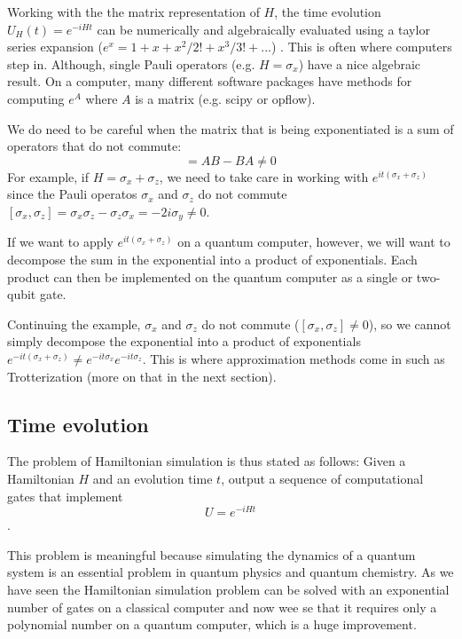 Working with the the matrix representation of $H$, the time evolution $U_H(t) = e^{-iHt}$ can be numerically and algebraically evaluated using a taylor series expansion ($e^x = 1 + x + x^2/2! + x^3/3! + ... $) . This is often where computers step in. Although, single Pauli operators (e.g. $H=\sigma_x$) have a nice algebraic result. On a computer, many different software packages have methods for computing $e^A$ where $A$ is a matrix (e.g. scipy or opflow).

We do need to be careful when the matrix that is being exponentiated is a sum of operators that do not commute:
\begin{equation}
[A,B] = AB - BA \neq 0
\end{equation}
 For example, if $H = \sigma_x + \sigma_z$, we need to take care in working with $e^{it(\sigma_x + \sigma_z)}$ since the Pauli operatos $\sigma_x$ and $\sigma_z$ do not commute $[\sigma_x, \sigma_z] = \sigma_x \sigma_z - \sigma_z \sigma_x = -2i\sigma_y \neq0$.
 
 If we want to apply $e^{it(\sigma_x + \sigma_z)}$ on a quantum computer, however, we will want to decompose the sum in the exponential into a product of exponentials. Each product can then be implemented on the quantum computer as a single or two-qubit gate. 
 
 Continuing the example, $\sigma_x$ and $\sigma_z$ do not commute ($[\sigma_x, \sigma_z] \neq 0$), so we cannot simply decompose the exponential into a product of exponentials $e^{-it(\sigma_x + \sigma_z)} \neq e^{-it\sigma_x}e^{-it\sigma_z}$. This is where approximation methods come in such as Trotterization (more on that in the next section).

\subsection{Time evolution}


The problem of Hamiltonian simulation is thus stated as follows: Given a Hamiltonian 
$H$ and an evolution time  $t$, output a sequence of computational gates that implement
\begin{equation}\label{eq:u}
U = e^{-iHt}
\end{equation}.

This problem is meaningful because simulating the dynamics of a quantum system is an essential problem in quantum physics and quantum chemistry. As we have seen the Hamiltonian simulation problem can be solved with an exponential number of gates on a classical computer and now wee se that it requires only a polynomial number on a quantum computer, which is a huge improvement.

